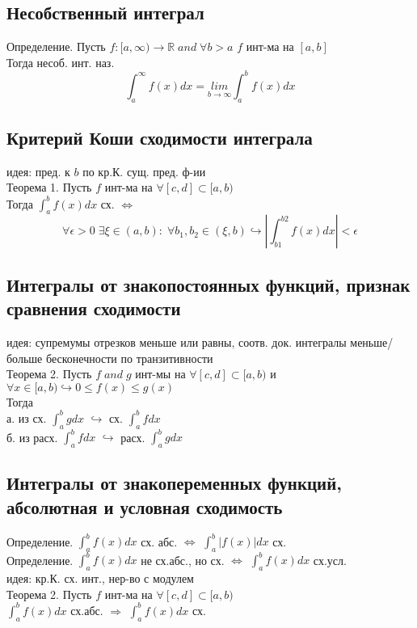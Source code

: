 \documentclass{article}
\begin{document}
\subsection{Несобственный интеграл}
Определение. Пусть $f:[a,\infty) \rightarrow \mathbb R \; and \; \forall b>a$ $f$ инт-ма на $[a,b]$ \\
Тогда несоб. инт. наз.
\begin{equation*}
    \int_a^\infty f(x) dx = \underset{b \rightarrow \infty}{lim} \int_a^b f(x) dx
\end{equation*}
\subsection{Критерий Коши сходимости интеграла}
идея: пред. к $b$ по кр.К. сущ. пред. ф-ии \\
Теорема 1. Пусть $f$ инт-ма на $\forall[c,d] \subset [a,b)$ \\
Тогда $\int_a^b f(x) dx$ сх. $\Leftrightarrow$
\begin{equation*}
    \forall \epsilon > 0 \; \exists \xi \in (a,b): \; \forall b_1,b_2 \in (\xi, b) \hookrightarrow |\int_{b1}^{b2}f(x)dx|<\epsilon
\end{equation*}
\subsection{Интегралы от знакопостоянных функций, признак сравнения сходимости}
идея: супремумы отрезков меньше или равны, соотв. док. интегралы меньше/больше бесконечности по транзитивности \\
Теорема 2. Пусть $f \; and \; g$ инт-мы на $\forall [c,d] \subset [a,b)$ и $\forall x \in [a,b) \hookrightarrow 0 \leq f(x) \leq g(x)$ \\
Тогда \\
а. из сх. $\int_a^b g dx$ $\hookrightarrow$ сх. $\int_a^b f dx$ \\
б. из расх. $\int_a^b f dx$ $\hookrightarrow$ расх. $\int_a^b g dx$
\subsection{Интегралы от знакопеременных функций, абсолютная и условная сходимость}
Определение. $\int_a^b f(x) dx$ сх. абс. $\Leftrightarrow$ $\int_a^b |f(x)| dx$ сх. \\
Определение.  $\int_a^b f(x) dx$ не сх.абс., но сх. $\Leftrightarrow$ $\int_a^b f(x) dx$ сх.усл. \\
идея: кр.К. сх. инт., нер-во с модулем \\
Теорема 2. Пусть $f$ инт-ма на $\forall [c,d] \subset [a,b)$ \\
$\int_a^b f(x) dx$ сх.абс. $\Rightarrow$ $\int_a^b f(x) dx$ сх.
\end{document}
